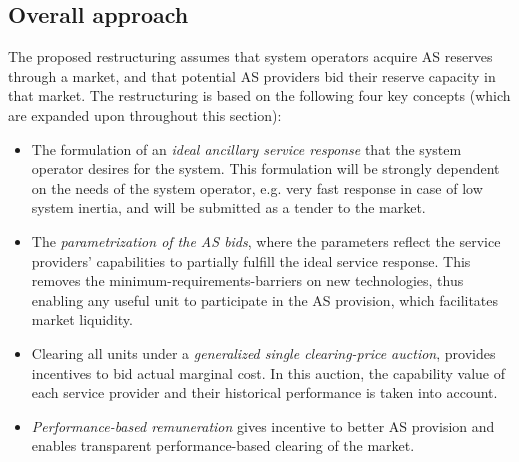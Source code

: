\subsection{Overall approach}

The proposed restructuring assumes that system operators acquire AS reserves through a market, and that potential AS providers bid their reserve capacity in that market. The restructuring is based on the following four key concepts (which are expanded upon throughout this section):
\begin{itemize}
    \item The formulation of an \emph{ideal ancillary service response} that the system operator desires for the system. This formulation will be strongly dependent on the needs of the system operator, e.g. very fast response in case of low system inertia, and will be submitted as a tender to the market.
    \item The \emph{parametrization of the AS bids}, where the parameters reflect the service providers' capabilities to partially fulfill the ideal service response. This removes the minimum-requirements-barriers on new technologies, thus enabling any useful unit to participate in the AS provision, which facilitates market liquidity.
    \item Clearing all units under a \emph{generalized single clearing-price auction}, provides incentives to bid actual marginal cost. In this auction, the capability value of each service provider and their historical performance is taken into account.
    \item \emph{Performance-based remuneration} gives incentive to better AS provision and enables transparent performance-based clearing of the market.
\end{itemize}

